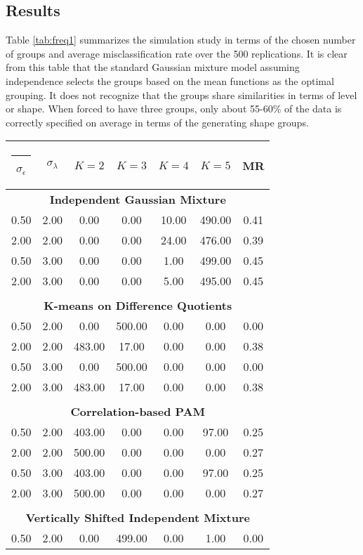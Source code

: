 \documentclass[12pt]{article}
\makeatletter
\newcommand{\thickhline}{%
    \noalign {\ifnum 0=`}\fi \hrule height 1.5pt
    \futurelet \reserved@a \@xhline
}
\makeatother
\begin{document}
\subsection{Results}
Table \ref{tab:freq1} summarizes the simulation study in terms of the chosen number of groups and average misclassification rate over the 500 replications. It is clear from this table that the standard Gaussian mixture model assuming independence selects the groups based on the mean functions as the optimal grouping. It does not recognize that the groups share similarities in terms of level or shape. When forced to have three groups, only about 55-60\% of the data is correctly specified on average in terms of the generating shape groups.
\begin{table}[ht]
\begin{center}
\begin{tabular}{ccccccc}
  \thickhline $\sigma_{\epsilon}$&$\sigma_{\lambda}$&$K=2$&$K=3$&$K=4$&$K=5$&MR\\ \hline\multicolumn{7}{c}{\textbf{Independent  Gaussian Mixture}}\\ 0.50 & 2.00 & 0.00 & 0.00 & 10.00 & 490.00 & 0.41 \\ 
  2.00 & 2.00 & 0.00 & 0.00 & 24.00 & 476.00 & 0.39 \\ 
  0.50 & 3.00 & 0.00 & 0.00 & 1.00 & 499.00 & 0.45 \\ 
  2.00 & 3.00 & 0.00 & 0.00 & 5.00 & 495.00 & 0.45 \\ 
   \\ \multicolumn{7}{c}{\textbf{K-means on Difference Quotients}}\\0.50 & 2.00 & 0.00 & 500.00 & 0.00 & 0.00 & 0.00 \\ 
  2.00 & 2.00 & 483.00 & 17.00 & 0.00 & 0.00 & 0.38 \\ 
  0.50 & 3.00 & 0.00 & 500.00 & 0.00 & 0.00 & 0.00 \\ 
  2.00 & 3.00 & 483.00 & 17.00 & 0.00 & 0.00 & 0.38 \\ 
   \\ \multicolumn{7}{c}{\textbf{Correlation-based PAM}}\\0.50 & 2.00 & 403.00 & 0.00 & 0.00 & 97.00 & 0.25 \\ 
  2.00 & 2.00 & 500.00 & 0.00 & 0.00 & 0.00 & 0.27 \\ 
  0.50 & 3.00 & 403.00 & 0.00 & 0.00 & 97.00 & 0.25 \\ 
  2.00 & 3.00 & 500.00 & 0.00 & 0.00 & 0.00 & 0.27 \\ 
   \\ \multicolumn{7}{c}{\textbf{Vertically Shifted Independent Mixture}}\\0.50 & 2.00 & 0.00 & 499.00 & 0.00 & 1.00 & 0.00 \\ 

\end{tabular}
\end{center}
\end{table}
\end{document}
